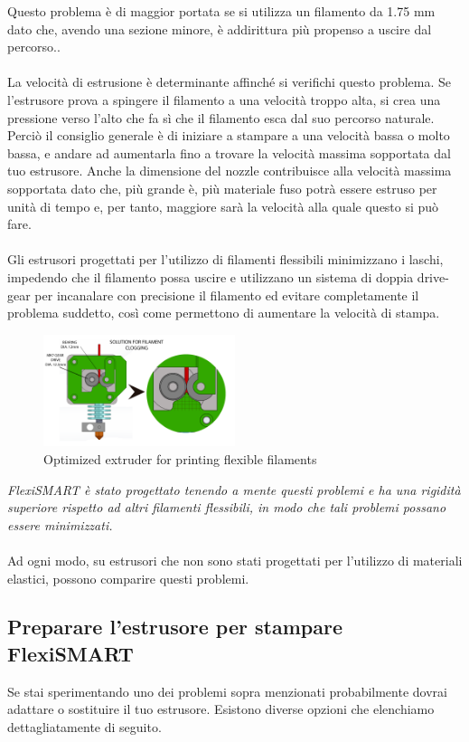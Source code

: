 \documentclass[11pt,a4paper]{article}
\begin{document}
Questo problema è di maggior portata se si utilizza un filamento da 1.75 mm dato che, avendo una sezione minore, è addirittura più propenso a uscire dal percorso..
\\\\
La velocità di estrusione è determinante affinché si verifichi questo problema. Se l'estrusore prova a spingere il filamento a una velocità troppo alta, si crea una pressione verso l'alto che fa sì che il filamento esca dal suo percorso naturale. Perciò il consiglio generale è di iniziare a stampare a una velocità bassa o molto bassa, e andare ad aumentarla fino a trovare la velocità massima sopportata dal tuo estrusore. Anche la dimensione del nozzle contribuisce alla velocità massima sopportata dato che, più grande è, più materiale fuso potrà essere estruso per unità di tempo e, per tanto, maggiore sarà la velocità alla quale questo si può fare. 
\\\\
Gli estrusori progettati per l'utilizzo di filamenti flessibili minimizzano i laschi, impedendo che il filamento possa uscire e utilizzano un sistema di doppia drive-gear per incanalare con precisione il filamento ed evitare completamente il problema suddetto, così come permettono di aumentare la velocità di stampa.
\begin{figure}[H]
\centering
\includegraphics[width=0.5\textwidth,cfbox=azul_marcos 4pt 0pt]{FOTOS/NUDOS2}
\caption*{Optimized extruder for printing flexible filaments}
\end{figure}
\emph{FlexiSMART è stato progettato tenendo a mente questi problemi e ha una rigidità superiore rispetto ad altri filamenti flessibili, in modo che tali problemi possano essere minimizzati.}
\\\\
Ad ogni modo, su estrusori che non sono stati progettati per l'utilizzo di materiali elastici, possono comparire questi problemi.
	\subsection{Preparare l'estrusore per stampare FlexiSMART}Se stai sperimentando uno dei problemi sopra menzionati probabilmente dovrai adattare o sostituire il tuo estrusore. Esistono diverse opzioni che elenchiamo dettagliatamente di seguito.
\end{document}
